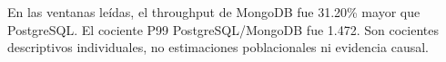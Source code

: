 En las ventanas leídas, el throughput de MongoDB fue 31.20\% mayor que PostgreSQL. El cociente P99 PostgreSQL/MongoDB fue 1.472. Son cocientes descriptivos individuales, no estimaciones poblacionales ni evidencia causal.